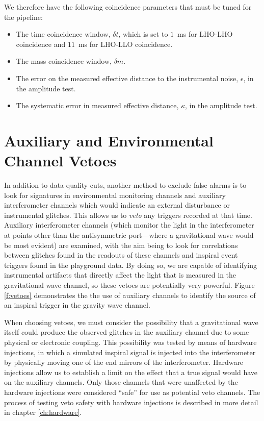 We therefore have the following coincidence parameters that must be tuned for
the pipeline:
\begin{itemize}
\item The time coincidence window, $\delta t$, which is set to $1$~ms for
LHO-LHO coincidence and $11$~ms for LHO-LLO coincidence.

\item The mass coincidence window, $\delta m$.

\item The error on the measured effective distance to the instrumental noise,
$\epsilon$, in the amplitude test.

\item The systematic error in measured effective distance, $\kappa$, in the
amplitude test.
\end{itemize}

\section{Auxiliary and Environmental Channel Vetoes}
\label{s:vetoes}

In addition to data quality cuts, another method to exclude false alarms is to
look for signatures in environmental monitoring channels and auxiliary
interferometer channels which would indicate an external disturbance or
instrumental glitches. This allows us to {\it veto} any triggers recorded at
that time.  Auxiliary interferometer channels (which monitor the light in the
interferometer at points other than the antisymmetric port---where a
gravitational wave would be most evident) are examined, with the aim being to
look for correlations between glitches found in the readouts of these channels
and inspiral event triggers found in the playground data.  By doing so, we are
capable of identifying instrumental artifacts that directly affect the light
that is measured in the gravitational wave channel, so these vetoes are
potentially very powerful. Figure \ref{f:vetoes} demonstrates the the use of
auxiliary channels to identify the source of an inspiral trigger in the
gravity wave channel.

When choosing vetoes, we must consider the possibility that a gravitational
wave itself could produce the observed glitches in the auxiliary channel due
to some physical or electronic coupling.  This possibility was tested by means
of hardware injections, in which a simulated inspiral signal is injected into
the interferometer by physically moving one of the end mirrors of the
interferometer. Hardware injections allow us to establish a limit on the
effect that a true signal would have on the auxiliary channels.  Only those
channels that were unaffected by the hardware injections were considered
``safe'' for use as potential veto channels. The process of testing veto
safety with hardware injections is described in more detail in chapter
\ref{ch:hardware}.

